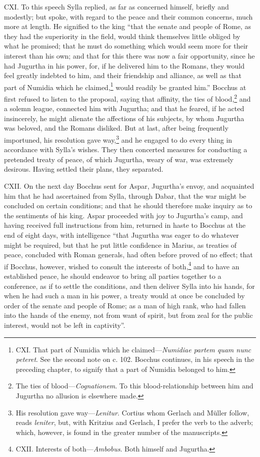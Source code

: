 CXI. To this speech Sylla replied, as far as concerned himself,
briefly and modestly; but spoke, with regard to the peace and their
common concerns, much more at length. He signified to the king ``that
the senate and people of Rome, as they had the superiority in the
field, would think themselves little obliged by what he promised; that
he must do something which would seem more for their interest than his
own; and that for this there was now a fair opportunity, since he had
Jugurtha in his power, for, if he delivered him to the Romans, they
would feel greatly indebted to him, and their friendship and alliance,
as well as that part of Numidia which he claimed,\footnote{CXI. That part of Numidia which he claimed—\emph{Numidiae partem
quam nunc peteret}. See the second note on c. 102. Bocchus continues,
in his speech in the preceding chapter, to signify that a part of
Numidia belonged to him.} would readily
be granted him.'' Bocchus at first refused to listen to the proposal,
saying that affinity, the ties of blood,\footnote{The ties of blood—\emph{Cognationem}. To this blood-relationship
between him and Jugurtha no allusion is elsewhere made.} and a solemn league,
connected him with Jugurtha; and that he feared, if he acted
insincerely, he might alienate the affections of his subjects, by whom
Jugurtha was beloved, and the Romans disliked. But at last, after
being frequently importuned, his resolution gave way,\footnote{His resolution gave way—\emph{Lenitur}. Cortius whom Gerlach and
Müller follow, reads \emph{leniter}, but, with Kritzius and Gerlach, I
prefer the verb to the adverb; which, however, is found in the greater
number of the manuscripts.} and he
engaged to do every thing in accordance with Sylla's wishes. They then
concerted measures for conducting a pretended treaty of peace, of
which Jugurtha, weary of war, was extremely desirous. Having settled
their plans, they separated.

CXII. On the next day Bocchus sent for Aspar, Jugurtha's envoy, and
acquainted him that he had ascertained from Sylla, through Dabar, that
the war might be concluded on certain conditions; and that he should
therefore make inquiry as to the sentiments of his king. Aspar
proceeded with joy to Jugurtha's camp, and having received full
instructions from him, returned in haste to Bocchus at the end of
eight days, with intelligence ``that Jugurtha was eager to do whatever
might be required, but that he put little confidence in Marius, as
treaties of peace, concluded with Roman generals, had often before
proved of no effect; that if Bocchus, however, wished to consult the
interests of both,\footnote{CXII. Interests of both—\emph{Ambobus}. Both himself and Jugurtha.} and to have an established peace, he should
endeavor to bring all parties together to a conference, as if to
settle the conditions, and then deliver Sylla into his hands, for when
he had such a man in his power, a treaty would at once be concluded by
order of the senate and people of Rome; as a man of high rank, who had
fallen into the hands of the enemy, not from want of spirit, but from
zeal for the public interest, would not be left in captivity''.

